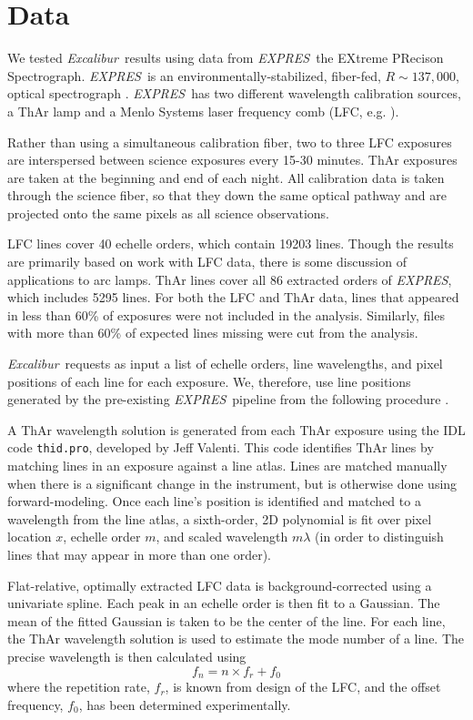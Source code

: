\documentclass[modern]{aastex63}
\newcommand{\project}[1]{\textsl{#1}}
\newcommand{\name}{\project{Excalibur}}
\newcommand{\acronym}[1]{{\small{#1}}}
\newcommand{\expres}{\project{\acronym{EXPRES}}}
\begin{document}
\section{Data} \label{sec:data}
We tested \name\ results using data from \expres\, the EXtreme PRecison Spectrograph.  \expres\ is an environmentally-stabilized, fiber-fed, $R\sim137,000$, optical spectrograph \citep{jurgenson2016, blackman2020}.  \expres\ has two different wavelength calibration sources, a ThAr lamp and a Menlo Systems laser frequency comb (LFC, e.g. \cite{wilken2012, molaro2013, probst2014}).

Rather than using a simultaneous calibration fiber, two to three LFC exposures are interspersed between science exposures every 15-30 minutes.  ThAr exposures are taken at the beginning and end of each night.  All calibration data is taken through the science fiber, so that they down the same optical pathway and are projected onto the same pixels as all science observations.

LFC lines cover 40 echelle orders, which contain 19203 lines.  Though the results are primarily based on work with LFC data, there is some discussion of applications to arc lamps.   ThAr lines cover all 86 extracted orders of \expres, which includes 5295 lines.  For both the LFC and ThAr data, lines that appeared in less than 60\% of exposures were not included in the analysis.  Similarly, files with more than 60\% of expected lines missing were cut from the analysis.  

 \name\ requests as input a list of echelle orders, line wavelengths, and pixel positions of each line for each exposure.  We, therefore, use line positions generated by the pre-existing \expres\ pipeline from the following procedure \citep{petersburg2020}.
 
 A ThAr wavelength solution is generated from each ThAr exposure using the IDL code \texttt{thid.pro}, developed by Jeff Valenti.  This code identifies ThAr lines by matching lines in an exposure against a line atlas.  Lines are matched manually when there is a significant change in the instrument, but is otherwise done using forward-modeling.  Once each line's position is identified and matched to a wavelength from the line atlas, a sixth-order, 2D polynomial is fit over pixel location $x$, echelle order $m$, and scaled wavelength $m\lambda$ (in order to distinguish lines that may appear in more than one order).
 
 Flat-relative, optimally extracted LFC data is background-corrected using a univariate spline.  Each peak in an echelle order is then fit to a Gaussian.  The mean of the fitted Gaussian is taken to be the center of the line.  For each line, the ThAr wavelength solution is used to estimate the mode number of a line.  The precise wavelength is then calculated using
 \begin{equation}
 f_n = n \times  f_r + f_0
 \label{eq:lfc}
 \end{equation}
 where the repetition rate, $f_r$, is known from design of the LFC, and the offset frequency, $f_0$, has been determined experimentally.
 
\end{document}
